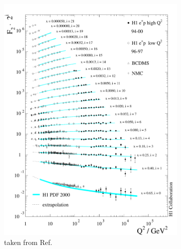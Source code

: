 \begin{figure}
	\centering
	\begin{subfigure}{0.45\linewidth}
		\includegraphics[width=\linewidth]{images/DIS_scaling}
		\caption{taken from Ref.\ \cite{theh1collaboration2003}}
		\label{subfig:DIS_scaling}
	\end{subfigure}
	\begin{subfigure}{0.45\linewidth}

\end{subfigure}
\end{figure}

